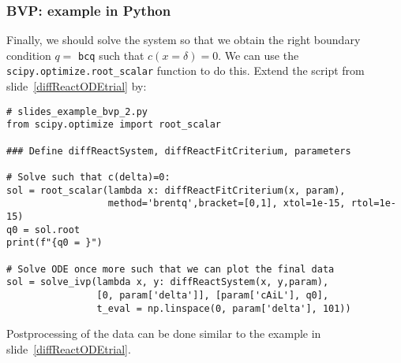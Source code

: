 \begin{frame}[fragile]
  \frametitle{BVP: example in Python}
  Finally, we should solve the system so that we obtain the right boundary condition $q=$ \lstinline$bcq$ such that $c(x=\delta)=0$. We can use the \lstinline$scipy.optimize.root_scalar$ function to do this. Extend the script from slide~\ref{diffReactODEtrial} by:
  \begin{lstlisting}
# slides_example_bvp_2.py
from scipy.optimize import root_scalar

### Define diffReactSystem, diffReactFitCriterium, parameters

# Solve such that c(delta)=0:
sol = root_scalar(lambda x: diffReactFitCriterium(x, param), 
                  method='brentq',bracket=[0,1], xtol=1e-15, rtol=1e-15)
q0 = sol.root
print(f"{q0 = }")

# Solve ODE once more such that we can plot the final data
sol = solve_ivp(lambda x, y: diffReactSystem(x, y,param), 
                [0, param['delta']], [param['cAiL'], q0], 
                t_eval = np.linspace(0, param['delta'], 101))
  \end{lstlisting}
  Postprocessing of the data can be done similar to the example in slide~\ref{diffReactODEtrial}.
\end{frame}


